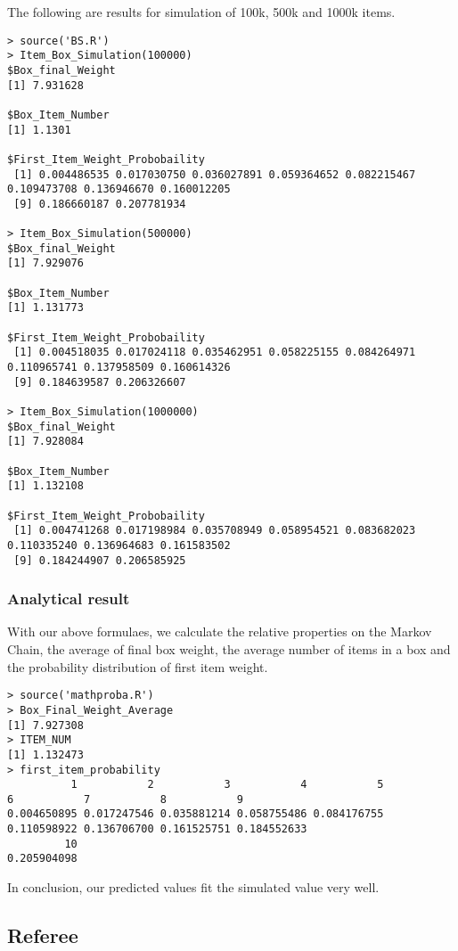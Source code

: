 \documentclass{article}
\begin{document}
\bigskip
The following are results for simulation of 100k, 500k and 1000k items.
\begin{lstlisting}
> source('BS.R')
> Item_Box_Simulation(100000)
$Box_final_Weight
[1] 7.931628

$Box_Item_Number
[1] 1.1301

$First_Item_Weight_Probobaility
 [1] 0.004486535 0.017030750 0.036027891 0.059364652 0.082215467 0.109473708 0.136946670 0.160012205
 [9] 0.186660187 0.207781934

> Item_Box_Simulation(500000)
$Box_final_Weight
[1] 7.929076

$Box_Item_Number
[1] 1.131773

$First_Item_Weight_Probobaility
 [1] 0.004518035 0.017024118 0.035462951 0.058225155 0.084264971 0.110965741 0.137958509 0.160614326
 [9] 0.184639587 0.206326607

> Item_Box_Simulation(1000000)
$Box_final_Weight
[1] 7.928084

$Box_Item_Number
[1] 1.132108

$First_Item_Weight_Probobaility
 [1] 0.004741268 0.017198984 0.035708949 0.058954521 0.083682023 0.110335240 0.136964683 0.161583502
 [9] 0.184244907 0.206585925
\end{lstlisting}

\subsubsection{Analytical result}
With our above formulaes, we calculate the relative properties on the Markov Chain, the average of final box weight, the average number of items in a box and the probability distribution of first item weight.

\begin{lstlisting}
> source('mathproba.R')
> Box_Final_Weight_Average
[1] 7.927308
> ITEM_NUM
[1] 1.132473
> first_item_probability
          1           2           3           4           5           6           7           8           9 
0.004650895 0.017247546 0.035881214 0.058755486 0.084176755 0.110598922 0.136706700 0.161525751 0.184552633 
         10 
0.205904098 
\end{lstlisting}

In conclusion, our predicted values fit the simulated value very well.

\subsection{Referee}
\end{document}
